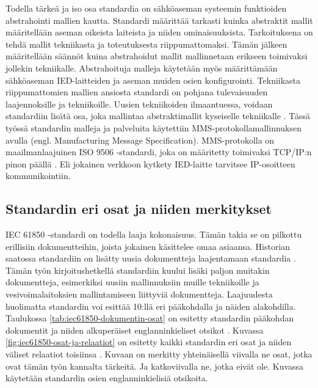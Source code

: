 Todella tärkeä ja iso osa standardia on sähköaseman systeemin funktioiden abstrahointi mallien kautta. Standardi määrittää tarkasti kuinka abstraktit mallit määritellään aseman oikeista laiteista ja niiden ominaisuuksista. Tarkoituksena on tehdä mallit tekniikasta ja toteutuksesta riippumattomaksi. Tämän jälkeen määritellään säännöt kuina abstrahoidut mallit mallinnetaan erikseen toimivaksi jollekin tekniikalle. Abstrahoituja malleja käytetään myös määrittämään sähköaseman IED-laitteiden ja aseman muiden osien konfigurointi. Tekniikasta riippumattomien mallien ansiosta standardi on pohjana tulevaisuuden laajennoksille ja tekniikoille. Uusien tekniikoiden ilmaantuessa, voidaan standardiin lisätä  osa, joka  mallintaa abstraktimallit kyseiselle tekniikalle \cite[s.~2]{Brunner2008}. Tässä työssä standardin malleja ja palveluita käytettiin MMS-protokollamallinnuksen avulla (engl. Manufacturing Message Specification). MMS-protokolla on maailmanlaajuinen ISO 9506 -standardi, joka on määritetty toimivaksi TCP/IP:n pinon päällä \cite{MMS-protocol-stack-and-API}. Eli jokainen verkkoon kytkety IED-laitte tarvitsee IP-osoitteen kommunikointiin.


\subsection{Standardin eri osat ja niiden merkitykset}	
IEC 61850 -standardi on todella laaja kokonaisuus. Tämän takia se on pilkottu erillisiin dokumentteihin, joista jokainen käsittelee omaa asiaansa. Historian saatossa standardiin on lisätty uusia dokumentteja laajentamaan standardia \cite{IEC61850series, New-documents-by-IEC-TC-57} \cite[s.~13]{IEC61850-1}. Tämän työn kirjoitushetkellä standardiin kuului lisäki paljon muitakin dokumentteja, esimerkiksi uusiin mallinnuksiin muille tekniikoille ja vesivoimalaitoksien mallintamiseen liittyviä dokumentteja. Laajuudesta huolimatta standardin voi esittää 10:llä eri pääkohdalla ja näiden alakohdilla. Taulukossa \ref{tab:iec61850-dokumentin-osat} on esitetty standardin pääkohdan dokumentit ja niiden alkuperäiset englanninkieliset otsikot \cite[s.~2]{Mackiewicz2006} \cite{IEC61850series}. Kuvassa \ref{fig:iec61850-osat-ja-relaatiot} on esitetty kaikki standardin eri osat ja niiden väliset relaatiot toisiinsa \cite[s.~14]{IEC61850-7-1} \cite[s.~22]{IEC61850-1}. Kuvaan on merkitty yhteinäisellä viivalla ne osat, jotka ovat tämän työn kannalta tärkeitä. Ja katkoviivalla ne, jotka eivät ole. Kuvassa käytetään standardin osien englanninkielisiä otsikoita.

